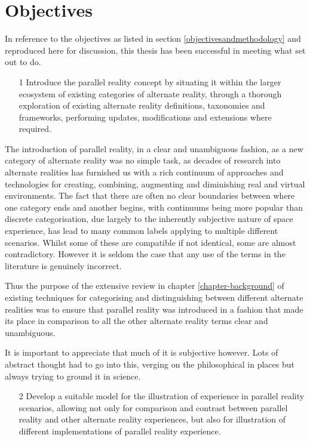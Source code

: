 
\section{Objectives}

In reference to the objectives as listed in section \ref{objectivesandmethodology} and reproduced here for discussion, this thesis has been successful in meeting what set out to do.

\begin{enumerate}
	\item[1] Introduce the parallel reality concept by situating it within the larger ecosystem of existing categories of alternate reality, through a thorough exploration of existing alternate reality definitions, taxonomies and frameworks, performing updates, modifications and extensions where required.
\end{enumerate}

The introduction of parallel reality, in a clear and unambiguous fashion, as a new category of alternate reality was no simple task, as decades of research into alternate realities has furnished us with a rich continuum of approaches and technologies for creating, combining, augmenting and diminishing real and virtual environments. The fact that there are often no clear boundaries between where one category ends and another begins, with continuums being more popular than discrete categorisation, due largely to the inherently subjective nature of space experience, has lead to many common labels applying to multiple different scenarios. Whilst some of these are compatible if not identical, some are almost contradictory. However it is seldom the case that any use of the terms in the literature is genuinely incorrect.

Thus the purpose of the extensive review in chapter \ref{chapter-background} of existing techniques for categorising and distinguishing between different alternate realities was to ensure that parallel reality was introduced in a fashion that made its place in comparison to all the other alternate reality terms clear and unambiguous.

It is important to appreciate that much of it is subjective however. Lots of abstract thought had to go into this, verging on the philosophical in places but always trying to ground it in science.

\begin{enumerate}
	\item[2] Develop a suitable model for the illustration of experience in parallel reality scenarios, allowing not only for comparison and contrast between parallel reality and other alternate reality experiences, but also for illustration of different implementations of parallel reality experience.
\end{enumerate}

